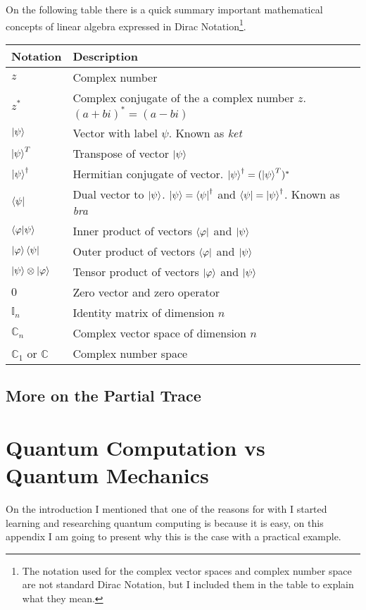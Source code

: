 On the following table there is a quick summary important mathematical concepts of linear algebra \cite{QCandQI:dirac_notation} expressed in Dirac Notation\footnote{The notation used for the complex vector spaces and complex number space are not standard Dirac Notation, but I included them in the table to explain what they mean.}. 

\begin{tabular}{ p{2cm}|p{12cm} }
	\hline
	Notation & Description \\
	\hline
	\hline
	$z$ & Complex number    \\
	$z^{*}$ & Complex conjugate of the a complex number $z$. $(a+ bi)^{*} = (a -bi)$\\
	$\ket{\psi} $ & Vector with label $\psi$. Known as \textit{ket}\\
	$\ket{\psi}^T$ & Transpose of vector $\ket{\psi}$ \\
	$\ket{\psi}^\dag $ &  Hermitian conjugate of vector. $\ket{\psi}^\dag = (\ket{\psi}^T)^* $\\
	$\bra{\psi} $ & Dual vector to $\ket{\psi}$. $ \ket{\psi} = \bra{\psi}^{\dag}$ and $\bra{\psi} = \ket{\psi}^\dag$. Known as \textit{bra}\\
	$ \bra{\varphi}\ket{\psi} $ & Inner product of vectors $\bra{\varphi}$ and $\ket{\psi}$ \\
	$ \ket{\varphi}\bra{\psi} $ & Outer product of vectors $\bra{\varphi}$ and $\ket{\psi}$ \\
	$ \ket{\psi}\otimes\ket{\varphi}$ & Tensor product of vectors $\ket{\varphi}$ and $\ket{\psi}$ \\
	$ 0 $ & Zero vector and zero operator \\
	$ \mathbb{I}_n $ & Identity matrix of dimension $n$ \\
	$ \mathbb{C}_n $ & Complex vector space of dimension $n$ \\
	$ \mathbb{C}_1$ or $\mathbb{C} $ & Complex number space \\
	
\end{tabular}
\section{More on the Partial Trace}

\chapter{Quantum Computation vs Quantum Mechanics}
On the introduction I mentioned that one of the reasons for with I started learning and researching quantum computing is because it is easy, on this appendix I am going to present why this is the case with a practical example.

